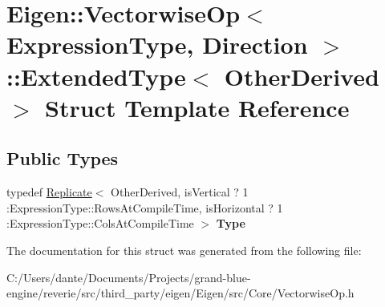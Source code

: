 \hypertarget{struct_eigen_1_1_vectorwise_op_1_1_extended_type}{}\section{Eigen\+::Vectorwise\+Op$<$ Expression\+Type, Direction $>$\+::Extended\+Type$<$ Other\+Derived $>$ Struct Template Reference}
\label{struct_eigen_1_1_vectorwise_op_1_1_extended_type}
\subsection*{Public Types}
\begin{DoxyCompactItemize}
\item 
\mbox{\label{struct_eigen_1_1_vectorwise_op_1_1_extended_type_a63e1778bf0805454e1b1d4b6fabdb167}} 
typedef \mbox{\hyperlink{class_eigen_1_1_replicate}{Replicate}}$<$ Other\+Derived, is\+Vertical ? 1 \+:Expression\+Type\+::\+Rows\+At\+Compile\+Time, is\+Horizontal ? 1 \+:Expression\+Type\+::\+Cols\+At\+Compile\+Time $>$ {\bfseries Type}
\end{DoxyCompactItemize}


The documentation for this struct was generated from the following file\+:\begin{DoxyCompactItemize}
\item 
C\+:/\+Users/dante/\+Documents/\+Projects/grand-\/blue-\/engine/reverie/src/third\+\_\+party/eigen/\+Eigen/src/\+Core/Vectorwise\+Op.\+h\end{DoxyCompactItemize}
